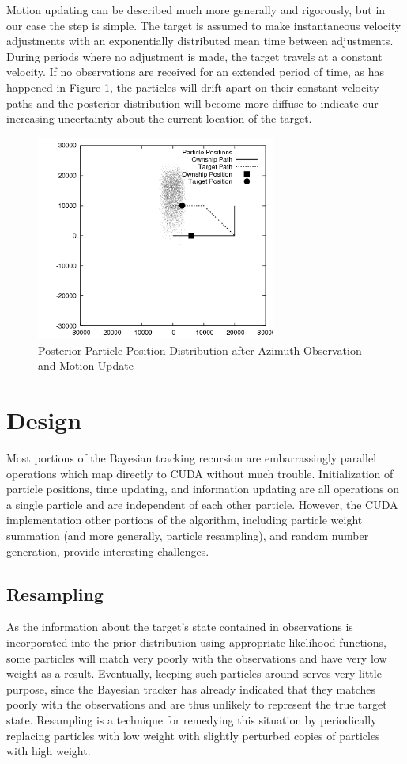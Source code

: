 \documentclass{article}
\begin{document}
Motion updating can be described much more generally and rigorously, but in our case the step is simple. The target is assumed to make instantaneous velocity adjustments with an exponentially distributed mean time between adjustments. During periods where no adjustment is made, the target travels at a constant velocity. If no observations are received for an extended period of time, as has happened in Figure \ref{posterior2}, the particles will drift apart on their constant velocity paths and the posterior distribution will become more diffuse to indicate our increasing uncertainty about the current location of the target.

\begin{figure}
\centering
\includegraphics[width=0.7\textwidth]{data/particles_motion.png}
\caption{Posterior Particle Position Distribution after Azimuth Observation and Motion Update}
\label{posterior2}
\end{figure}

\section{Design}
Most portions of the Bayesian tracking recursion are embarrassingly parallel operations which map directly to CUDA without much trouble. Initialization of particle positions, time updating, and information updating are all operations on a single particle and are independent of each other particle. However, the CUDA implementation other portions of the algorithm, including particle weight summation (and more generally, particle resampling), and random number generation, provide interesting challenges.

\subsection{Resampling}\label{Resampling}
As the information about the target's state contained in observations is incorporated into the prior distribution using appropriate likelihood functions, some particles will match very poorly with the observations and have very low weight as a result. Eventually, keeping such particles around serves very little purpose, since the Bayesian tracker has already indicated that they matches poorly with the observations and are thus unlikely to represent the true target state. Resampling is a technique for remedying this situation by periodically replacing particles with low weight with slightly perturbed copies of particles with high weight.
\end{document}
